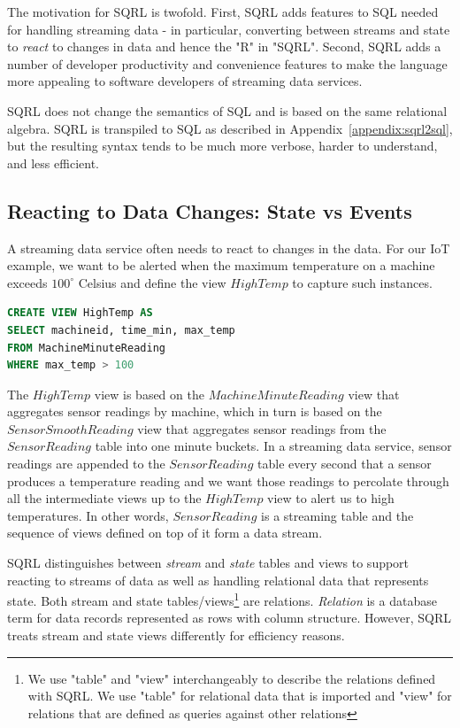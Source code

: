 \documentclass[	DIV=calc,%
							paper=letter,%
							fontsize=11pt,%
							twocolumn]{scrartcl}	 					%
\begin{document}
The motivation for SQRL is twofold. First, SQRL adds features to SQL needed for handling streaming data - in particular, converting between streams and state to \emph{react} to changes in data and hence the "R" in "SQRL".
Second, SQRL adds a number of developer productivity and convenience features to make the language more appealing to software developers of streaming data services.

SQRL does not change the semantics of SQL and is based on the same relational algebra. SQRL is transpiled to SQL as described in Appendix~\ref{appendix:sqrl2sql}, but the resulting syntax tends to be much more verbose, harder to understand, and less efficient.

\subsection{Reacting to Data Changes: State vs Events}

A streaming data service often needs to react to changes in the data.
For our IoT example, we want to be alerted when the maximum temperature on a machine exceeds $100^{\circ}$ Celsius and define the view $HighTemp$ to capture such instances.

\begin{lstlisting}[language=SQL]
CREATE VIEW HighTemp AS
SELECT machineid, time_min, max_temp
FROM MachineMinuteReading
WHERE max_temp > 100
\end{lstlisting}

The $HighTemp$ view is based on the $MachineMinuteReading$ view that aggregates sensor readings by machine, which in turn is based on the $SensorSmoothReading$ view that aggregates sensor readings from the $SensorReading$ table into one minute buckets. In a streaming data service, sensor readings are appended to the $SensorReading$ table every second that a sensor produces a temperature reading and we want those readings to percolate through all the intermediate views up to the $HighTemp$ view to alert us to high temperatures. In other words, $SensorReading$ is a streaming table and the sequence of views defined on top of it form a data stream.

SQRL distinguishes between \emph{stream} and \emph{state} tables and views to support reacting to streams of data as well as handling relational data that represents state. Both stream and state tables/views\footnote{We use "table" and "view" interchangeably to describe the relations defined with SQRL. We use "table" for relational data that is imported and "view" for relations that are defined as queries against other relations}  are relations. \emph{Relation} is a database term for data records represented as rows with column structure. However, SQRL treats stream and state views differently for efficiency reasons.
\end{document}
